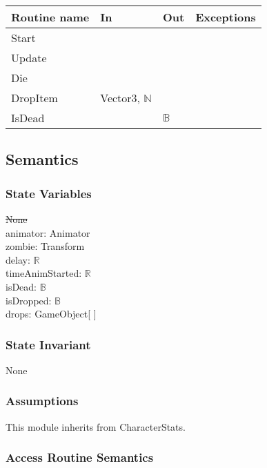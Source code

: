 \documentclass[12pt]{article}
\begin{document}
\begin{tabular}{| l | l | l | l |}
\hline
\textbf{Routine name} & \textbf{In} & \textbf{Out} & \textbf{Exceptions}\\
\hline
{\color{magenta} Start} & ~  & ~ & ~\\
{\color{magenta} Update} & ~  & ~ & ~\\
Die & ~  & ~ & ~\\
{\color{magenta} DropItem} &  {\color{magenta} Vector3, $\mathbb{N}$}  & ~ & ~\\
{\color{magenta} IsDead} & ~  & {\color{magenta} $\mathbb{B}$} & ~\\
\hline
\end{tabular}

\subsection* {Semantics}

\subsubsection* {State Variables}

\sout{None} \\
{\color{magenta} animator: Animator} \\
{\color{magenta} zombie: Transform} \\
{\color{magenta} delay: $\mathbb{R}$} \\
{\color{magenta} timeAnimStarted: $\mathbb{R}$} \\
{\color{magenta} isDead: $\mathbb{B}$} \\
{\color{magenta} isDropped: $\mathbb{B}$} \\
{\color{magenta} drops: GameObject[  ]} \\

\subsubsection* {State Invariant}

None

\subsubsection* {Assumptions}

This module inherits from CharacterStats.

\subsubsection* {Access Routine Semantics}
\end{document}
